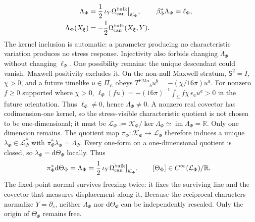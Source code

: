 \documentclass[aps,prl,reprint]{revtex4-2}
\newcommand{\EM}{\mathrm{EM}}
\newcommand{\dd}{\mathrm d}
\newcommand{\cK}{\mathcal K}
\begin{document}
\begin{equation}
\begin{aligned}
\Lambda_\Phi
&=\frac12\,\iota_Y\Omega_{\rm can}^{\rm bulk}\big|_{\cK_\Phi},
&\beta_\Phi^*\Lambda_\Phi&=\ell_\Phi,\\
\Lambda_\Phi(X_{\boldsymbol\xi})
&=-\frac12\Omega_{\rm can}^{\rm bulk}(X_{\boldsymbol\xi},Y).
\end{aligned}
\label{eq:Lambda}
\end{equation}
The kernel inclusion is automatic: a parameter producing no characteristic variation produces no stress response. Injectivity also forbids changing $\Lambda_\Phi$ without changing $\ell_\Phi$. One possibility remains: the unique descendant could vanish. Maxwell positivity excludes it. On the non-null Maxwell stratum, $\mathsf S^2=I$, $\chi>0$, and a future timelike $u\in\Pi_L$ obeys $T^{\EM a}{}_bu^b=-(\chi/16\pi)u^a$. For nonzero $f\ge0$ supported where $\chi>0$, $\ell_\Phi(fu)=-(16\pi)^{-1}\int_\Sigma f\chi\,\epsilon_a u^a>0$ in the future orientation. Thus $\ell_\Phi\neq0$, hence $\Lambda_\Phi\neq0$. A nonzero real covector has codimension-one kernel, so the stress-visible characteristic quotient is not chosen to be one-dimensional; it must be
$\mathcal L_\Phi:=\cK_\Phi/\ker\Lambda_\Phi\simeq\operatorname{im}\Lambda_\Phi=\mathbb R$.
Only one dimension remains. The quotient map $\pi_\Phi:\cK_\Phi\to\mathcal L_\Phi$ therefore induces a unique $\lambda_\Phi\in\mathcal L_\Phi^*$ with $\pi_\Phi^*\lambda_\Phi=\Lambda_\Phi$. Every one-form on a one-dimensional quotient is closed, so $\lambda_\Phi=\dd\Theta_\Phi$ locally. Thus
\begin{equation}
\pi_\Phi^*\dd\Theta_\Phi
=\Lambda_\Phi
=\frac12\,\iota_Y\Omega_{\rm can}^{\rm bulk}\big|_{\cK_\Phi},
\qquad
[\Theta_\Phi]\in C^\infty(\mathcal L_\Phi)/\mathbb R .
\label{eq:clockdescent}
\end{equation}
The fixed-point normal survives freezing twice: it fixes the surviving line and the covector that measures displacement along it. Because the reciprocal characters normalize $Y=\partial_s$, neither $\Lambda_\Phi$ nor $\dd\Theta_\Phi$ can be independently rescaled. Only the origin of $\Theta_\Phi$ remains free.
\end{document}
